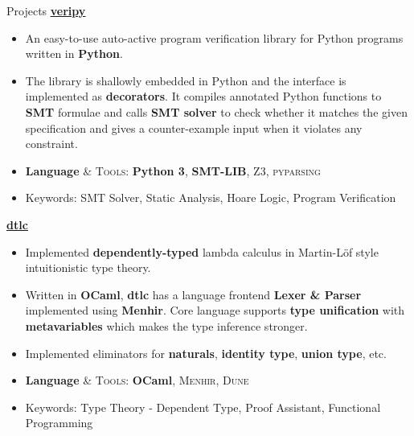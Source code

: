\documentclass{resume}
\newcommand{\myul}[2][blue]{\setulcolor{#1}\ul{#2}\setulcolor{blue}}
\begin{document}
\begin{rSection}{Projects}
		\textbf{\href{https://github.com/AD1024/veripy}{\color{blue} \myul{veripy}}} %
		\vspace{-5pt}

		\begin{itemize}
			\setlength{\itemsep}{1pt}
            \setlength{\parskip}{0pt}
			\setlength{\parsep}{0pt}
			\item An easy-to-use auto-active program verification library for Python programs written in \textbf{Python}.
			\item The library is shallowly embedded in Python and the interface is implemented as \textbf{decorators}. It compiles annotated Python functions to \textbf{SMT} formulae and calls \textbf{SMT solver} to check whether it matches the given specification and gives a counter-example input when it violates any constraint.
			\item \textbf{Language} \& \textsc{Tools}: \textbf{Python 3}, \textbf{SMT-LIB}, \textsc{Z3}, \textsc{pyparsing}
			\item Keywords: SMT Solver, Static Analysis, Hoare Logic, Program Verification
		\end{itemize}

		\textbf{\href{https://github.com/AD1024/dtlc}{\color{blue} \myul{dtlc}}} %
		\vspace{-5pt}

		\begin{itemize}
			\setlength{\itemsep}{1pt}
            \setlength{\parskip}{0pt}
			\setlength{\parsep}{0pt}
			\item Implemented \textbf{dependently-typed} lambda calculus in Martin-Löf style intuitionistic type theory.
			\item Written in \textbf{OCaml}, \textbf{dtlc} has a language frontend \textbf{Lexer \& Parser} implemented using \textbf{Menhir}. Core language supports \textbf{type unification} with \textbf{metavariables} which makes the type inference stronger.
			\item Implemented eliminators for \textbf{naturals}, \textbf{identity type}, \textbf{union type}, etc.
			\item \textbf{Language} \& \textsc{Tools}: \textbf{OCaml}, \textsc{Menhir}, \textsc{Dune}
			\item Keywords: Type Theory - Dependent Type, Proof Assistant, Functional Programming
		\end{itemize}
    \end{rSection}
\end{document}
